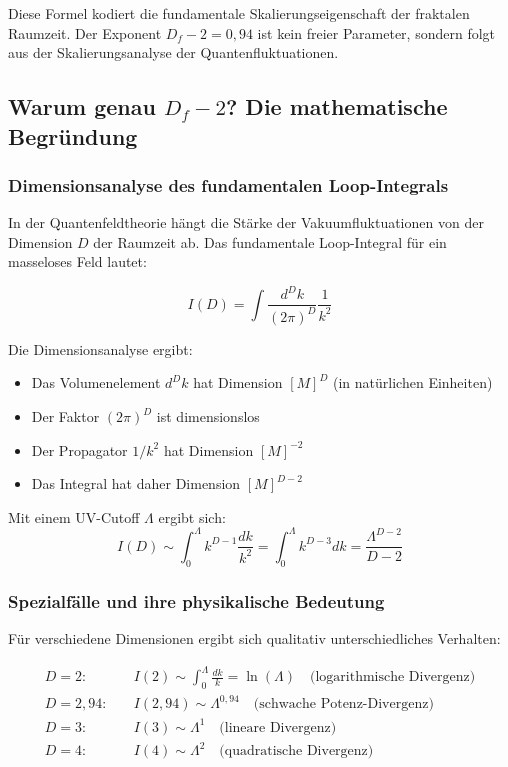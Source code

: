 \documentclass[12pt,a4paper]{article}
\theoremstyle{definition}
\begin{document}
	Diese Formel kodiert die fundamentale Skalierungseigenschaft der fraktalen Raumzeit. Der Exponent $D_f - 2 = 0{,}94$ ist kein freier Parameter, sondern folgt aus der Skalierungsanalyse der Quantenfluktuationen.
	
	\subsection{Warum genau $D_f - 2$? Die mathematische Begründung}
	
	\subsubsection{Dimensionsanalyse des fundamentalen Loop-Integrals}
	
	In der Quantenfeldtheorie hängt die Stärke der Vakuumfluktuationen von der Dimension $D$ der Raumzeit ab. Das fundamentale Loop-Integral für ein masseloses Feld lautet:
	
	\begin{equation}
		I(D) = \int \frac{d^D k}{(2\pi)^D} \frac{1}{k^2}
	\end{equation}
	
	Die Dimensionsanalyse ergibt:
	\begin{itemize}
		\item Das Volumenelement $d^D k$ hat Dimension $[M]^D$ (in natürlichen Einheiten)
		\item Der Faktor $(2\pi)^D$ ist dimensionslos
		\item Der Propagator $1/k^2$ hat Dimension $[M]^{-2}$
		\item Das Integral hat daher Dimension $[M]^{D-2}$
	\end{itemize}
	
	Mit einem UV-Cutoff $\Lambda$ ergibt sich:
	\begin{equation}
		I(D) \sim \int_0^{\Lambda} k^{D-1} \frac{dk}{k^2} = \int_0^{\Lambda} k^{D-3} dk = \frac{\Lambda^{D-2}}{D-2}
	\end{equation}
	
	\subsubsection{Spezialfälle und ihre physikalische Bedeutung}
	
	Für verschiedene Dimensionen ergibt sich qualitativ unterschiedliches Verhalten:
	
	\begin{align}
		D = 2: \quad &I(2) \sim \int_0^{\Lambda} \frac{dk}{k} = \ln(\Lambda) \quad \text{(logarithmische Divergenz)}\\
		D = 2{,}94: \quad &I(2{,}94) \sim \Lambda^{0{,}94} \quad \text{(schwache Potenz-Divergenz)}\\
		D = 3: \quad &I(3) \sim \Lambda^{1} \quad \text{(lineare Divergenz)}\\
		D = 4: \quad &I(4) \sim \Lambda^{2} \quad \text{(quadratische Divergenz)}
	\end{align}
	
\end{document}

